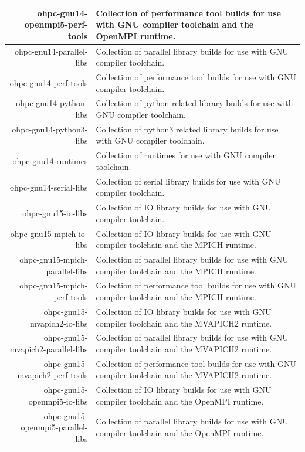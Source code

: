 \begin{tabularx}{\textwidth}{r|X}
\hline
ohpc-gnu14-openmpi5-perf-tools & Collection of performance tool builds for use with GNU compiler toolchain and the OpenMPI runtime. \\
\hline
ohpc-gnu14-parallel-libs & Collection of parallel library builds for use with GNU compiler toolchain. \\
\hline
ohpc-gnu14-perf-tools & Collection of performance tool builds for use with GNU compiler toolchain. \\
\hline
ohpc-gnu14-python-libs & Collection of python related library builds for use with GNU compiler toolchain. \\
\hline
ohpc-gnu14-python3-libs & Collection of python3 related library builds for use with GNU compiler toolchain. \\
\hline
ohpc-gnu14-runtimes & Collection of runtimes for use with GNU compiler toolchain. \\
\hline
ohpc-gnu14-serial-libs & Collection of serial library builds for use with GNU compiler toolchain. \\
\hline
ohpc-gnu15-io-libs & Collection of IO library builds for use with GNU compiler toolchain. \\
\hline
ohpc-gnu15-mpich-io-libs & Collection of IO library builds for use with GNU compiler toolchain and the MPICH runtime. \\
\hline
ohpc-gnu15-mpich-parallel-libs & Collection of parallel library builds for use with GNU compiler toolchain and the MPICH runtime. \\
\hline
ohpc-gnu15-mpich-perf-tools & Collection of performance tool builds for use with GNU compiler toolchain and the MPICH runtime. \\
\hline
ohpc-gnu15-mvapich2-io-libs & Collection of IO library builds for use with GNU compiler toolchain and the MVAPICH2 runtime. \\
\hline
ohpc-gnu15-mvapich2-parallel-libs & Collection of parallel library builds for use with GNU compiler toolchain and the MVAPICH2 runtime. \\
\hline
ohpc-gnu15-mvapich2-perf-tools & Collection of performance tool builds for use with GNU compiler toolchain and the MVAPICH2 runtime. \\
\hline
ohpc-gnu15-openmpi5-io-libs & Collection of IO library builds for use with GNU compiler toolchain and the OpenMPI runtime. \\
\hline
ohpc-gnu15-openmpi5-parallel-libs & Collection of parallel library builds for use with GNU compiler toolchain and the OpenMPI runtime. \\

\end{tabularx}
